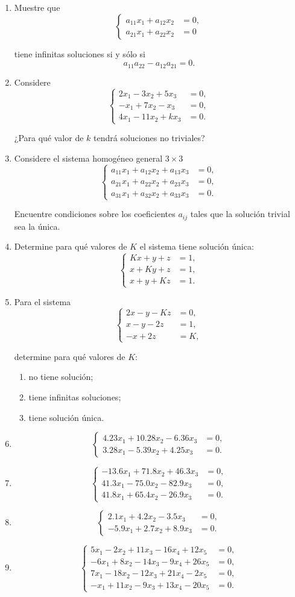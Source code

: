 \documentclass[12pt]{article}
\newcommand{\sistema}[1]{%
\[
\left\{
\begin{aligned}
#1
\end{aligned}
\right.
\]
}
\begin{document}
\begin{enumerate}[label=\textbf{H\arabic*.},start=21,leftmargin=*]
\item Muestre que
\sistema{a_{11}x_1+a_{12}x_2&=0,\\a_{21}x_1+a_{22}x_2&=0}
tiene infinitas soluciones si y sólo si
\[
a_{11}a_{22}-a_{12}a_{21}=0.
\]

\item Considere
\sistema{
2x_1-3x_2+5x_3&=0,\\
-x_1+7x_2-x_3&=0,\\
4x_1-11x_2+kx_3&=0.
}
¿Para qué valor de $k$ tendrá soluciones no triviales?

\item Considere el sistema homogéneo general $3\times3$
\sistema{
a_{11}x_1+a_{12}x_2+a_{13}x_3&=0,\\
a_{21}x_1+a_{22}x_2+a_{23}x_3&=0,\\
a_{31}x_1+a_{32}x_2+a_{33}x_3&=0.
}
Encuentre condiciones sobre los coeficientes $a_{ij}$ tales que la solución trivial sea la única.

\item Determine para qué valores de $K$ el sistema tiene solución única:
\sistema{
Kx+y+z&=1,\\
x+Ky+z&=1,\\
x+y+Kz&=1.
}

\item Para el sistema
\sistema{
2x-y-Kz&=0,\\
x-y-2z&=1,\\
-x+2z&=K,
}
determine para qué valores de $K$:
\begin{enumerate}[label=\alph*)]
\item no tiene solución;
\item tiene infinitas soluciones;
\item tiene solución única.
\end{enumerate}

\item \sistema{
4.23x_1+10.28x_2-6.36x_3&=0,\\
3.28x_1-5.39x_2+4.25x_3&=0.
}

\item \sistema{
-13.6x_1+71.8x_2+46.3x_3&=0,\\
41.3x_1-75.0x_2-82.9x_3&=0,\\
41.8x_1+65.4x_2-26.9x_3&=0.
}

\item \sistema{
2.1x_1+4.2x_2-3.5x_3&=0,\\
-5.9x_1+2.7x_2+8.9x_3&=0.
}

\item \sistema{
5x_1-2x_2+11x_3-16x_4+12x_5&=0,\\
-6x_1+8x_2-14x_3-9x_4+26x_5&=0,\\
7x_1-18x_2-12x_3+21x_4-2x_5&=0,\\
-x_1+11x_2-9x_3+13x_4-20x_5&=0.
}
\end{enumerate}
\end{document}
